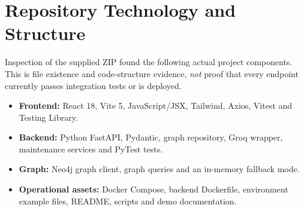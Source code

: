 \documentclass[11pt,a4paper,oneside]{report}
\begin{document}
\section{Repository Technology and Structure}
Inspection of the supplied ZIP found the following actual project components. This is file existence and code-structure evidence, \emph{not} proof that every endpoint currently passes integration tests or is deployed.
\begin{itemize}
\item \textbf{Frontend:} React 18, Vite 5, JavaScript/JSX, Tailwind, Axios, Vitest and Testing Library.
\item \textbf{Backend:} Python FastAPI, Pydantic, graph repository, Groq wrapper, maintenance services and PyTest tests.
\item \textbf{Graph:} Neo4j graph client, graph queries and an in-memory fallback mode.
\item \textbf{Operational assets:} Docker Compose, backend Dockerfile, environment example files, README, scripts and demo documentation.
\end{itemize}
\end{document}
